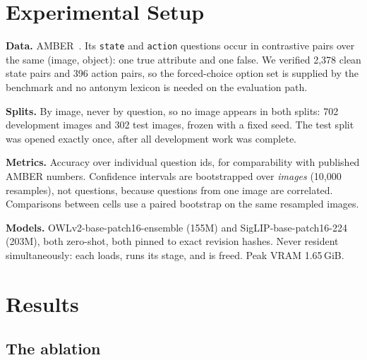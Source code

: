 \documentclass[conference]{IEEEtran}
\begin{document}
\section{Experimental Setup}

\textbf{Data.} AMBER~\cite{amber2023}. Its \texttt{state} and \texttt{action}
questions occur in contrastive pairs over the same (image, object): one true
attribute and one false. We verified 2{,}378 clean state pairs and 396 action
pairs, so the forced-choice option set is supplied by the benchmark and no
antonym lexicon is needed on the evaluation path.

\textbf{Splits.} By image, never by question, so no image appears in both splits:
702 development images and 302 test images, frozen with a fixed seed. The test
split was opened exactly once, after all development work was complete.

\textbf{Metrics.} Accuracy over individual question ids, for comparability with
published AMBER numbers. Confidence intervals are bootstrapped over
\emph{images} (10{,}000 resamples), not questions, because questions from one
image are correlated. Comparisons between cells use a paired bootstrap on the
same resampled images.

\textbf{Models.} OWLv2-base-patch16-ensemble (155M) and SigLIP-base-patch16-224
(203M), both zero-shot, both pinned to exact revision hashes. Never resident
simultaneously: each loads, runs its stage, and is freed. Peak VRAM 1.65\,GiB.

\section{Results}

\subsection{The ablation}
\end{document}
